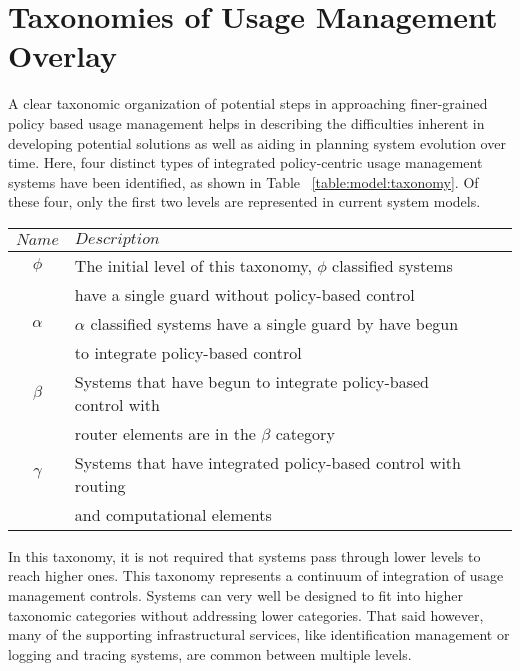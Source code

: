 \section{Taxonomies of Usage Management Overlay}
A clear taxonomic organization of potential steps in approaching finer-grained policy based usage management helps in describing the difficulties inherent in developing potential solutions as well as aiding in planning system evolution over time. Here, four distinct types of integrated policy-centric usage management systems have been identified, as shown in Table ~\ref{table:model:taxonomy}.  Of these four, only the first two levels are represented in current system models.

\begin{table*}[tp] %
\centering %
\begin{tabular}{clcc}
\toprule %
$ Name$ 	& $Description$ \\\toprule %
$\phi$ 		& The initial level of this taxonomy, $\phi$ classified systems \\
 			& have a single guard without policy-based control \\\midrule
$\alpha$	& $\alpha$ classified systems have a single guard by have begun \\
			& to integrate policy-based control \\\midrule
$\beta$		& Systems that have begun to integrate policy-based control with \\
			& router elements are in the $\beta$ category \\\midrule
$\gamma$	& Systems that have integrated policy-based control with routing \\
			& and computational elements \\\midrule
\end{tabular}
\caption{Proposed Usage Management Taxonomy}
\label{table:model:taxonomy}
\end{table*}

In this taxonomy, it is not required that systems pass through lower levels to reach higher ones.  This taxonomy represents a continuum of integration of usage management controls.  Systems can very well be designed to fit into higher taxonomic categories without addressing lower categories.  That said however, many of the supporting infrastructural services, like identification management or logging and tracing systems, are common between multiple levels.

